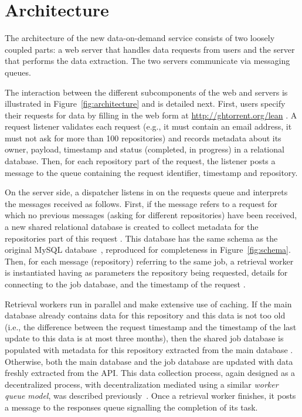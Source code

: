 
\section{Architecture}
\label{sec:arch}

The architecture of the new \ght data-on-demand service consists of two loosely coupled parts:
a web server that handles data requests from users and the \ght server that performs the data extraction.
The two servers communicate via messaging queues.

The interaction between the different subcomponents of the web and \ght servers is illustrated in
Figure~\ref{fig:architecture} and is detailed next.
First, users specify their requests for data by filling in the web form at \url{http://ghtorrent.org/lean} .
A request listener validates each request (e.g., it must contain an email address, it must not ask for
more than 100 repositories)
and records metadata about its owner, payload, 
timestamp and status (completed, in progress) in
a relational database.
Then, for each \gh repository part of the request, the listener posts a message to the queue 
containing the request identifier, timestamp and repository.

On the \ght server side, a dispatcher listens in on the requests queue  and interprets the
messages received as follows.
First, if the message refers to a request for which no previous messages (asking for different repositories)
have been received, a new shared relational database is created to collect metadata for the repositories part
of this request .
This database has the same schema as the original \ght MySQL database~\cite{gousios2013ghtorent},
reproduced for completeness in Figure~\ref{fig:schema}.
Then, for each message (repository) referring to the same job, a retrieval worker is instantiated having
as parameters the repository being requested, details for connecting to the job database, and the
timestamp of the request .

Retrieval workers run in parallel and make extensive use of caching.
If the main \ght database already contains data for this repository and this data is not too old
(i.e., the difference between the request timestamp and the timestamp of the last update to this data is at
most three months), then the shared job database is populated with metadata for this
repository extracted from the main \ght database . 
Otherwise, both the main \ght database and the job database  are updated with data freshly extracted
from the \gh API.
This data collection process, again designed as a decentralized process, with decentralization mediated
using a similar \emph{worker queue model}, was described previously~\cite{gousios2013ghtorent}.
Once a retrieval worker finishes, it posts a message to the responses queue  signalling
the completion of its task.

